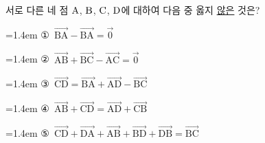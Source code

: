 서로 다른 네 점 $\mathrm{A}$, $\mathrm{B}$, $\mathrm{C}$, $\mathrm{D}$에 대하여 다음 중 옳지 \underline{않은} 것은?
\par\medskip\par\noindent\hangindent=1.4em {\small ①}\ $\overrightarrow{\mathrm{BA}}-\overrightarrow{\mathrm{BA}}=\vec{0}$\par\noindent\hangindent=1.4em {\small ②}\ $\overrightarrow{\mathrm{AB}}+\overrightarrow{\mathrm{BC}}-\overrightarrow{\mathrm{AC}}=\vec{0}$\par\noindent\hangindent=1.4em {\small ③}\ $\overrightarrow{\mathrm{CD}}=\overrightarrow{\mathrm{BA}}+\overrightarrow{\mathrm{AD}}-\overrightarrow{\mathrm{BC}}$\par\noindent\hangindent=1.4em {\small ④}\ $\overrightarrow{\mathrm{AB}}+\overrightarrow{\mathrm{CD}}=\overrightarrow{\mathrm{AD}}+\overrightarrow{\mathrm{CB}}$\par\noindent\hangindent=1.4em {\small ⑤}\ $\overrightarrow{\mathrm{CD}}+\overrightarrow{\mathrm{DA}}+\overrightarrow{\mathrm{AB}}+\overrightarrow{\mathrm{BD}}+\overrightarrow{\mathrm{DB}}=\overrightarrow{\mathrm{BC}}$\par\medskip
